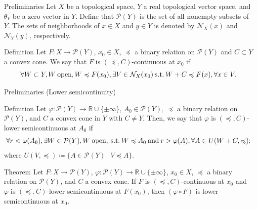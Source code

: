 \documentclass[aspectratio=169, dvipdfmx, 11pt]{beamer}
\newcommand{\RealNumberSet}{\mathbb{R}}
\newcommand{\SuchThat}{\:\text{s.t.}\:}
\newcommand{\SetForm}[2]{
  \{{#1}\:|\:{#2}\}
}
\begin{document}
\begin{frame}{Preliminaries}
  Let $X$ be a topological space, $Y$ a real topological vector space, and $\theta_Y$ be a zero vector in $Y$.
  Define that $\mathcal{P}(Y)$ is the set of all nonempty subsets of $Y$.
  The sets of neighborhoods of $x \in X$ and $y \in Y$ is denoted by $\mathcal{N}_X (x)$ and $\mathcal{N}_Y (y)$, respectively.

  \begin{block}{Definition \cite{500001551932}}
    Let $F \colon X \to \mathcal{P}(Y)$, $x_0 \in X$, $\preccurlyeq$ a binary relation on $\mathcal{P}(Y)$
    and $C \subset Y$ a convex cone. We say that $F$ is $(\preccurlyeq, C)$-continuous at $x_0$ if
    \begin{equation}
      \forall W \subset Y, W\:\text{open},W \preccurlyeq F(x_0), \exists V \in \mathcal{N}_{X}(x_0) \SuchThat W + C \preccurlyeq F(x), \forall x \in V. \notag
    \end{equation}
  \end{block}
\end{frame}

\begin{frame}{Preliminaries (Lower semicontinuity)}
  \begin{block}{Definition \cite{500001551932}}
    Let $\varphi \colon \mathcal{P}(Y) \to \RealNumberSet \cup \{\pm \infty\}$, $A_0 \in \mathcal{P}(Y)$,
    $\preccurlyeq$ a binary relation on $\mathcal{P}(Y)$, and $C$ a convex cone in $Y$ with $C \ne Y$. Then,
    we say that $\varphi$ is $(\preccurlyeq, C)$-lower semicontinuous at $A_0$ if
    \begin{equation}
      \forall r < \varphi (A_0), \exists W \in \mathcal{P}(Y), W\:\text{open}, \SuchThat W \preccurlyeq A_0 \:\text{and}\:
      r > \varphi (A), \forall A \in U(W + C, \preccurlyeq); \notag
    \end{equation}
    where $U(V,\preccurlyeq) \coloneqq \SetForm{A \in \mathcal{P}(Y)}{V \preccurlyeq A}$.
  \end{block}

  \begin{block}{Theorem \cite{500001551932}}
    Let $F \colon X \to \mathcal{P}(Y)$, $\varphi \colon \mathcal{P}(Y) \to \RealNumberSet \cup \{\pm \infty\}$, $x_0 \in X$,
    $\preccurlyeq$ a binary relation on $\mathcal{P}(Y)$, and $C$ a convex cone. If $F$ is $(\preccurlyeq, C)$-continuous at $x_0$
    and $\varphi$ is $(\preccurlyeq, C)$-lower semicontinuous at $F(x_0)$, then $(\varphi \circ F)$ is lower semicontinuous at $x_0$.
  \end{block}
\end{frame}
\end{document}

